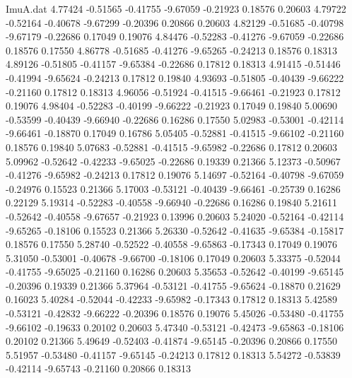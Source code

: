 \begin{filecontents}{ImuA.dat}
   4.77424   -0.51565   -0.41755   -9.67059   -0.21923    0.18576    0.20603
   4.79722   -0.52164   -0.40678   -9.67299   -0.20396    0.20866    0.20603
   4.82129   -0.51685   -0.40798   -9.67179   -0.22686    0.17049    0.19076
   4.84476   -0.52283   -0.41276   -9.67059   -0.22686    0.18576    0.17550
   4.86778   -0.51685   -0.41276   -9.65265   -0.24213    0.18576    0.18313
   4.89126   -0.51805   -0.41157   -9.65384   -0.22686    0.17812    0.18313
   4.91415   -0.51446   -0.41994   -9.65624   -0.24213    0.17812    0.19840
   4.93693   -0.51805   -0.40439   -9.66222   -0.21160    0.17812    0.18313
   4.96056   -0.51924   -0.41515   -9.66461   -0.21923    0.17812    0.19076
   4.98404   -0.52283   -0.40199   -9.66222   -0.21923    0.17049    0.19840
   5.00690   -0.53599   -0.40439   -9.66940   -0.22686    0.16286    0.17550
   5.02983   -0.53001   -0.42114   -9.66461   -0.18870    0.17049    0.16786
   5.05405   -0.52881   -0.41515   -9.66102   -0.21160    0.18576    0.19840
   5.07683   -0.52881   -0.41515   -9.65982   -0.22686    0.17812    0.20603
   5.09962   -0.52642   -0.42233   -9.65025   -0.22686    0.19339    0.21366
   5.12373   -0.50967   -0.41276   -9.65982   -0.24213    0.17812    0.19076
   5.14697   -0.52164   -0.40798   -9.67059   -0.24976    0.15523    0.21366
   5.17003   -0.53121   -0.40439   -9.66461   -0.25739    0.16286    0.22129
   5.19314   -0.52283   -0.40558   -9.66940   -0.22686    0.16286    0.19840
   5.21611   -0.52642   -0.40558   -9.67657   -0.21923    0.13996    0.20603
   5.24020   -0.52164   -0.42114   -9.65265   -0.18106    0.15523    0.21366
   5.26330   -0.52642   -0.41635   -9.65384   -0.15817    0.18576    0.17550
   5.28740   -0.52522   -0.40558   -9.65863   -0.17343    0.17049    0.19076
   5.31050   -0.53001   -0.40678   -9.66700   -0.18106    0.17049    0.20603
   5.33375   -0.52044   -0.41755   -9.65025   -0.21160    0.16286    0.20603
   5.35653   -0.52642   -0.40199   -9.65145   -0.20396    0.19339    0.21366
   5.37964   -0.53121   -0.41755   -9.65624   -0.18870    0.21629    0.16023
   5.40284   -0.52044   -0.42233   -9.65982   -0.17343    0.17812    0.18313
   5.42589   -0.53121   -0.42832   -9.66222   -0.20396    0.18576    0.19076
   5.45026   -0.53480   -0.41755   -9.66102   -0.19633    0.20102    0.20603
   5.47340   -0.53121   -0.42473   -9.65863   -0.18106    0.20102    0.21366
   5.49649   -0.52403   -0.41874   -9.65145   -0.20396    0.20866    0.17550
   5.51957   -0.53480   -0.41157   -9.65145   -0.24213    0.17812    0.18313
   5.54272   -0.53839   -0.42114   -9.65743   -0.21160    0.20866    0.18313

\end{filecontents}
